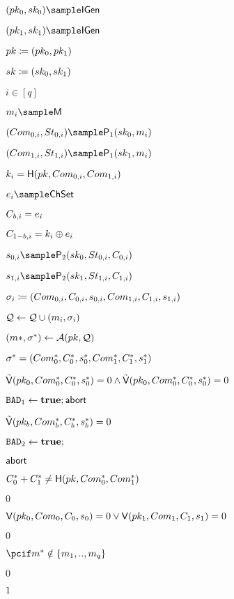 \begin{figure}[htb!]
{{\begin{minipage}[t]{0.8\textwidth}
\begin{nicodemus}
            \item $(\pk_0,\sk_0)\sample\IDGen$
            \item $(\pk_1,\sk_1)\sample\IDGen$
            \item $pk \coloneqq (pk_0,pk_1)$
            \item $sk \coloneqq (sk_0, sk_1)$
            \item \pcfor $i \in [q]$
                \item \quad $ \m_i \sample \mathsf{M}$
            	\item	\quad $(\com_{0,i},\st_{0,i})\sample\IDP_1(\sk_0,\m_i)$
		\item \quad $(\com_{1,i},\st_{1,i})\sample\IDP_1(\sk_1,\m_i)$ 
		\item \quad $ k_i = \mathsf{H}(pk,Com_{0,i},Com_{1,i}) $
  		\item \quad $ e_i \sample \ChSet$
		\item \quad $C_{b,i} = e_i$  
		\item \quad $ C_{1-b,i} = k_i \oplus e_i $
		\item \quad $\s_{0,i} \sample\IDP_2(\sk_0,\st_{0,i},\c_{0,i})$
		\item \quad $ \s_{1,i} \sample\IDP_2(\sk_1,\st_{1,i},\c_{1,i})$
		\item \quad $\sigma_i \coloneqq (Com_{0,i},C_{0,i},s_{0,i}, Com_{1,i}, C_{1,i},s_{1,i})$
                \item \quad $\mathcal{Q} \leftarrow \mathcal{Q} \cup (m_i,\sigma_i) $
                \item $(m*, \sigma^*)\gets\mathcal{A}(pk,\mathcal{Q})$
                \item \pcparse $\sigma^* = (Com_0^*,C_0^*,s_0^*, Com_1^*, C_1^*,s_1^*)$
                \item \pcif $\tilde{\mathsf{V}}(pk_0,Com^*_0,C^*_0,s^*_0) = 0 \land \tilde{\mathsf{V}}(pk_0,Com^*_0,C^*_0,s^*_0) = 0$
                \item \pcthen $\texttt{BAD}_1 \leftarrow \textbf{true};\mathsf{abort}$
                 \item \pcif $\tilde{\mathsf{V}}(pk_b,Com^*_b,C^*_b,s^*_b) = 0$
                 \item \pcthen $\texttt{BAD}_2 \leftarrow \textbf{true};$
                 \item \quad $\mathsf{abort}$
            	\item \pcif $C_0^*+C_1^* \neq \mathsf{H}(pk,Com^*_0,Com^*_1) $
		\item \quad \pcthen \pcreturn $0$
		\item \pcif $\mathsf{V}(pk_0,Com_0,C_0,s_0) = 0 \lor \mathsf{V}(pk_1,Com_1,C_1,s_1) =0$
		\item \quad \pcthen \pcreturn $0$
		 \item $\pcif m^* \notin \{m_1,..,m_q\} $
		 \item \quad \pcthen \pcreturn $0$
		\item \pcelse \pcreturn $1$
                

            \end{nicodemus}
        \end{minipage}
    }}
    \caption{}
    \label{fig:x-soundess}
\end{figure}
